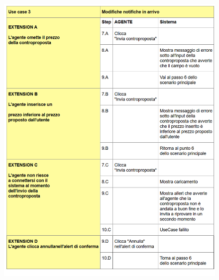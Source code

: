 \begin{figure}[H]
	\centering
	\includegraphics[width=1\linewidth]{"Immagini/cockburn/controproposta estensioni.png"}
	\caption[CockBurn extensions: registra nuovo agente]{}
	\label{fig:controproposta-estensioni}
\end{figure}